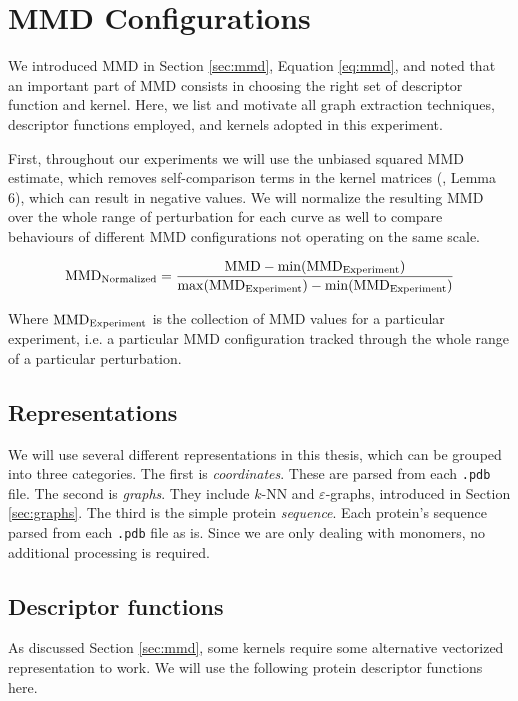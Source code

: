 \section{MMD Configurations}

We introduced MMD in Section \ref{sec:mmd}, Equation \ref{eq:mmd}, and
noted that an important part of MMD consists in choosing the right set of
descriptor function and kernel. Here, we list and motivate all graph extraction techniques,
descriptor functions employed, and kernels adopted in this experiment.

First, throughout our experiments we will use the unbiased squared MMD estimate,
which removes self-comparison terms in the kernel matrices
(\cite{gretton2012kernel}, Lemma 6), which can result in negative values. We
will normalize the resulting MMD over the whole range of perturbation for each
curve as well to compare behaviours of different MMD configurations not
operating on the same scale.

\begin{equation}
  \label{eq:normalization}
  \text{MMD}_{\textnormal{Normalized}} = {\text{MMD} - \min(\text{MMD}_{\textnormal{Experiment}}) \over \max(\text{MMD}_{\textnormal{Experiment}}) - \min(\text{MMD}_{\textnormal{Experiment}})}
\end{equation}

Where $\text{MMD}_{\textnormal{Experiment}}$ is the collection of MMD values for a particular
experiment, i.e. a particular MMD configuration tracked through the whole range
of a particular perturbation.

\subsection{Representations}
We will use several different representations in this thesis, which can be
grouped into three categories. The first is \emph{coordinates}. These are parsed
from each \texttt{.pdb} file. The second is \emph{graphs}. They include $k$-NN
and $\varepsilon$-graphs, introduced in Section \ref{sec:graphs}. The third is
the simple protein \emph{sequence}. Each protein's sequence parsed from each
\texttt{.pdb} file as is. Since we are only dealing with monomers, no additional
processing is required.

\subsection{Descriptor functions}\label{sec:descriptors}

As discussed Section \ref{sec:mmd}, some kernels require some alternative vectorized
representation to work. We will use the following protein descriptor functions
here.


